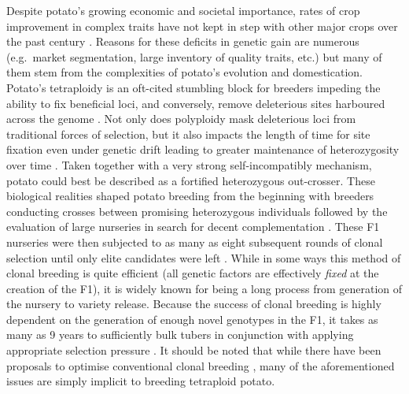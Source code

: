 Despite potato's growing economic and societal importance, rates of crop improvement in complex traits have not kept in step with other major crops over the past century \parencite{Douches1996, Hirsch2013}. Reasons for these deficits in genetic gain are numerous (e.g.~market segmentation, large inventory of quality traits, etc.) but many of them stem from the complexities of potato's evolution and domestication. Potato's tetraploidy is an oft-cited stumbling block for breeders impeding the ability to fix beneficial loci, and conversely, remove deleterious sites harboured across the genome \parencite{Lian2019, Zhang2019}. Not only does polyploidy mask deleterious loci from traditional forces of selection, but it also impacts the length of time for site fixation even under genetic drift leading to greater maintenance of heterozygosity over time \parencite{Bartlett1934}. Taken together with a very strong self-incompatibly mechanism, potato could best be described as a fortified heterozygous out-crosser. These biological realities shaped potato breeding from the beginning with breeders conducting crosses between promising heterozygous individuals followed by the evaluation of large nurseries in search for decent complementation \parencite{Simmonds1979}. These F1 nurseries were then subjected to as many as eight subsequent rounds of clonal selection until only elite candidates were left \parencite{Bradshaw2017}. While in some ways this method of clonal breeding is quite efficient (all genetic factors are effectively \emph{fixed} at the creation of the F1), it is widely known for being a long process from generation of the nursery to variety release. Because the success of clonal breeding is highly dependent on the generation of enough novel genotypes in the F1, it takes as many as 9 years to sufficiently bulk tubers in conjunction with applying appropriate selection pressure \parencite{Bryan1981, Tai1984}. It should be noted that while there have been proposals to optimise conventional clonal breeding \parencite{Neele1991, Bradshaw2003}, many of the aforementioned issues are simply implicit to breeding tetraploid potato.

